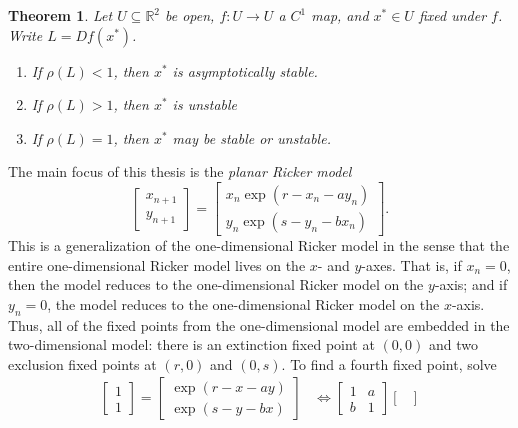\documentclass{article}
\newcommand{\reals}{\mathbb{R}}
\theoremstyle{plain}
\newtheorem{theorem}{Theorem}
\theoremstyle{definition}
\newcommand{\jacobian}[1]{D{#1}}
\begin{document}
\begin{theorem}
  Let \(U \subseteq \reals^2\) be open, \(f : U \to U\) a \(C^1\) map, and \(x^* \in U\) fixed under \(f\). Write \(L = \jacobian{f}(x^*)\).
  \begin{enumerate}
  \item If \(\rho(L) < 1\), then \(x^*\) is asymptotically stable.
  \item If \(\rho(L) > 1\), then \(x^*\) is unstable
  \item If \(\rho(L) = 1\), then \(x^*\) may be stable or unstable.
  \end{enumerate}
\end{theorem}

\begin{example}
  The main focus of this thesis is the \emph{planar Ricker model}
  \[
    \begin{bmatrix}
      x_{n + 1} \\ y_{n + 1}
    \end{bmatrix}
    =
    \begin{bmatrix}
      x_{n}\exp(r - x_n - ay_n)
      \\
      y_{n}\exp(s - y_n - bx_n)
    \end{bmatrix}.
  \]
  This is a generalization of the one-dimensional Ricker model in the sense that the entire one-dimensional Ricker model lives on the \(x\)- and \(y\)-axes. That is, if \(x_n = 0\), then the model reduces to the one-dimensional Ricker model on the \(y\)-axis; and if \(y_n = 0\), the model reduces to the one-dimensional Ricker model on the \(x\)-axis. Thus, all of the fixed points from the one-dimensional model are embedded in the two-dimensional model: there is an extinction fixed point at \((0, 0)\) and two exclusion fixed points at \((r, 0)\) and \((0, s)\). To find a fourth fixed point, solve
  \[
    \begin{aligned}
      \begin{bmatrix}
        1
        \\
        1
      \end{bmatrix}
      =
      \begin{bmatrix}
        \exp(r - x - ay)
        \\
        \exp(s - y - bx)
      \end{bmatrix}
      &\iff
      \begin{bmatrix}
        1 & a
        \\
        b & 1
      \end{bmatrix}
      \begin{bmatrix}

\end{bmatrix}
\end{aligned}\]
\end{example}
\end{document}
